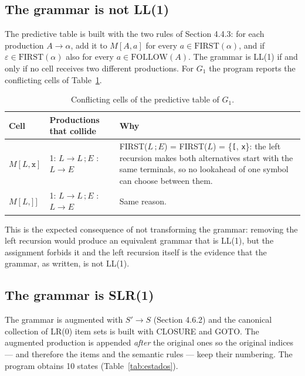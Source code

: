 \documentclass[11pt,letterpaper]{article}
\newcommand{\nt}[1]{\texttt{#1}}
\begin{document}
\subsection{The grammar is not LL(1)}

The predictive table is built with the two rules of Section 4.4.3: for each production $A \to
\alpha$, add it to $M[A,a]$ for every $a \in \mathrm{FIRST}(\alpha)$, and if $\varepsilon \in
\mathrm{FIRST}(\alpha)$ also for every $a \in \mathrm{FOLLOW}(A)$. The grammar is LL(1) if and only
if no cell receives two different productions. For $G_1$ the program reports the conflicting cells
of Table~\ref{tab:conflictos}.

\begin{table}[H]
\centering
\small
\caption{Conflicting cells of the predictive table of $G_1$.}
\label{tab:conflictos}
\begin{tabularx}{\textwidth}{@{}l l >{\raggedright\arraybackslash}X@{}}
\toprule
\textbf{Cell} & \textbf{Productions that collide} & \textbf{Why}\\
\midrule
$M[L,\nt{x}]$ & 1: $L \to L\,;E$ \newline 2: $L \to E$ &
FIRST($L\,;E$) = FIRST($L$) = \{\nt{[}, \nt{x}\}: the left recursion makes both alternatives start
with the same terminals, so no lookahead of one symbol can choose between them.\\
$M[L,\nt{]}]$ & 1: $L \to L\,;E$ \newline 2: $L \to E$ & Same reason.\\
\bottomrule
\end{tabularx}
\end{table}

This is the expected consequence of not transforming the grammar: removing the left recursion would
produce an equivalent grammar that is LL(1), but the assignment forbids it and the left recursion
itself is the evidence that the grammar, as written, is not LL(1).

\subsection{The grammar is SLR(1)}

The grammar is augmented with $S' \to S$ (Section 4.6.2) and the canonical collection of LR(0) item
sets is built with CLOSURE and GOTO. The augmented production is appended \emph{after} the original
ones so the original indices --- and therefore the items and the semantic rules --- keep their
numbering. The program obtains 10 states (Table~\ref{tab:estados}).
\end{document}
